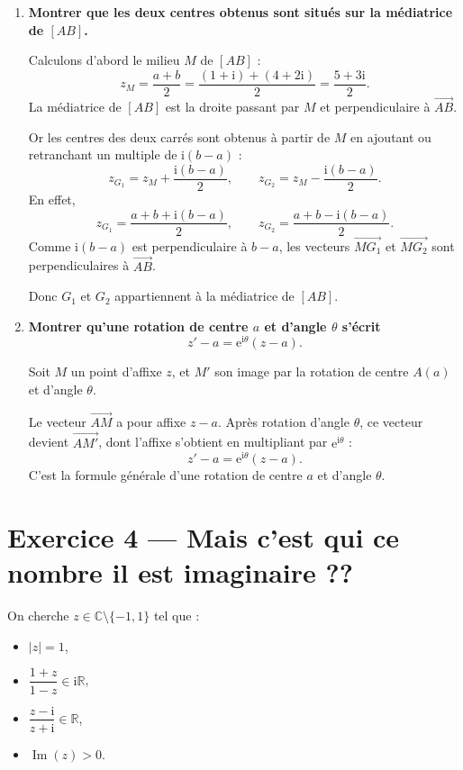 \documentclass[11pt,a4paper]{article}
\newcommand{\C}{\mathbb{C}}
\newcommand{\R}{\mathbb{R}}
\newcommand{\ii}{\mathrm{i}}
\newcommand{\e}{\mathrm{e}}
\newcommand{\im}{\operatorname{Im}}
\begin{document}
\begin{enumerate}[label=\textbf{\arabic*.}]
    Ainsi
    \[
    \boxed{z_{G_1}=2+3\ii,\qquad z_{G_2}=3.}
    \]

    \item \textbf{Montrer que les deux centres obtenus sont situés sur la médiatrice de \([AB]\).}

    Calculons d’abord le milieu \(M\) de \([AB]\) :
    \[
    z_M=\frac{a+b}{2}=\frac{(1+\ii)+(4+2\ii)}{2}=\frac{5+3\ii}{2}.
    \]
    La médiatrice de \([AB]\) est la droite passant par \(M\) et perpendiculaire à \(\overrightarrow{AB}\).

    Or les centres des deux carrés sont obtenus à partir de \(M\) en ajoutant ou retranchant un multiple de \(\ii(b-a)\) :
    \[
    z_{G_1}=z_M+\frac{\ii(b-a)}{2},\qquad
    z_{G_2}=z_M-\frac{\ii(b-a)}{2}.
    \]
    En effet,
    \[
    z_{G_1}=\frac{a+b+\ii(b-a)}{2},
    \qquad
    z_{G_2}=\frac{a+b-\ii(b-a)}{2}.
    \]
    Comme \(\ii(b-a)\) est perpendiculaire à \(b-a\), les vecteurs \(\overrightarrow{MG_1}\) et \(\overrightarrow{MG_2}\) sont perpendiculaires à \(\overrightarrow{AB}\).

    Donc \(G_1\) et \(G_2\) appartiennent à la médiatrice de \([AB]\).

    \item \textbf{Montrer qu’une rotation de centre \(a\) et d’angle \(\theta\) s’écrit
    \[
    z'-a=\e^{\ii\theta}(z-a).
    \]}

    Soit \(M\) un point d’affixe \(z\), et \(M'\) son image par la rotation de centre \(A(a)\) et d’angle \(\theta\).

    Le vecteur \(\overrightarrow{AM}\) a pour affixe \(z-a\). Après rotation d’angle \(\theta\), ce vecteur devient \(\overrightarrow{AM'}\), dont l’affixe s’obtient en multipliant par \(\e^{\ii\theta}\) :
    \[
    z'-a=\e^{\ii\theta}(z-a).
    \]
    C’est la formule générale d’une rotation de centre \(a\) et d’angle \(\theta\).

\end{enumerate}

\newpage

\section*{Exercice 4 --- Mais c’est qui ce nombre il est imaginaire ??}

On cherche \(z\in\C\setminus\{-1,1\}\) tel que :
\begin{itemize}
    \item \(|z|=1\),
    \item \(\dfrac{1+z}{1-z}\in\ii\R\),
    \item \(\dfrac{z-\ii}{z+\ii}\in\R\),
    \item \(\im(z)>0\).
\end{itemize}
\end{document}
